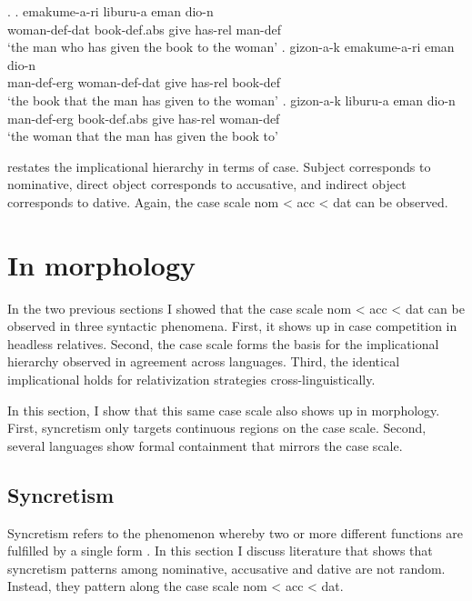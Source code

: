 \ex.\label{ex:basque-rel}
\ag. emakume-a-ri liburu-a eman dio-n \\
 woman-\ac{def}-\ac{dat} book-\ac{def}.\ac{abs} give has-\ac{rel} man-\ac{def}\\
 `the man who has given the book to the woman'\label{ex:basque-sub}
\bg. gizon-a-k emakume-a-ri eman dio-n \\
 man-\ac{def}-\ac{erg} woman-\ac{def}-\ac{dat} give has-\ac{rel} book-\ac{def}\\
 `the book that the man has given to the woman'\label{ex:basque-do}
\bg. gizon-a-k liburu-a eman dio-n \\
 man-\ac{def}-\ac{erg} book-\ac{def}.\ac{abs} give has-\ac{rel} woman-\ac{def}\\
 `the woman that the man has given the book to' \label{ex:basque-io}

\citet{caha2009} restates the implicational hierarchy in terms of case. Subject corresponds to nominative, direct object corresponds to accusative, and indirect object corresponds to dative. Again, the case scale \ac{nom} < \ac{acc} < \ac{dat} can be observed.


\section{In morphology}\label{sec:case-morphology}

In the two previous sections I showed that the case scale \ac{nom} < \ac{acc} < \ac{dat} can be observed in three syntactic phenomena. First, it shows up in case competition in headless relatives. Second, the case scale forms the basis for the implicational hierarchy observed in agreement across languages. Third, the identical implicational holds for relativization strategies cross-linguistically.

In this section, I show that this same case scale also shows up in morphology. First, syncretism only targets continuous regions on the case scale. Second, several languages show formal containment that mirrors the case scale.


\subsection{Syncretism}

Syncretism refers to the phenomenon whereby two or more different functions are fulfilled by a single form \citep[cf.][]{baerman2002}. In this section I discuss literature that shows that syncretism patterns among nominative, accusative and dative are not random. Instead, they pattern along the case scale \ac{nom} < \ac{acc} < \ac{dat}.

